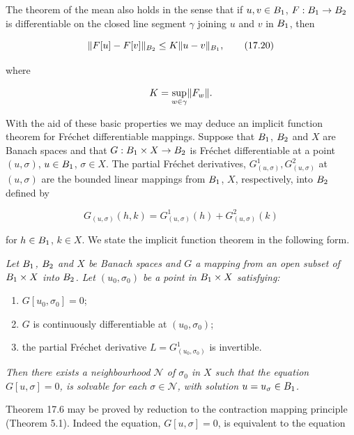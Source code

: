 The theorem of the mean also holds in the sense that if $u, v \in B_1$, $F : B_1 \to B_2$ is differentiable on the closed line segment $\gamma$ joining $u$ and $v$ in $B_1$, then

\begin{equation}
\lVert F[u] - F[v]\rVert_{B_2} \leq K \lVert u - v\rVert_{B_1},
\tag{17.20}
\end{equation}

where

\[
K = \sup_{w \in \gamma} \lVert F_w\rVert.
\]

With the aid of these basic properties we may deduce an implicit function theorem for Fr\'echet differentiable mappings. Suppose that $B_1$, $B_2$ and $X$ are Banach spaces and that $G : B_1 \times X \to B_2$ is Fr\'echet differentiable at a point $(u,\sigma)$, $u \in B_1$, $\sigma \in X$. The partial Fr\'echet derivatives, $G^{1}_{(u,\sigma)}, G^{2}_{(u,\sigma)}$ at $(u,\sigma)$ are the bounded linear mappings from $B_1$, $X$, respectively, into $B_2$ defined by

\[
G_{(u,\sigma)}(h,k) = G^{1}_{(u,\sigma)}(h) + G^{2}_{(u,\sigma)}(k)
\]

for $h \in B_1$, $k \in X$. We state the implicit function theorem in the following form.

\begin{theorem}[Theorem 17.6]\label{gt-ch17-thm-17-6}
\textit{Let $B_1$, $B_2$ and $X$ be Banach spaces and $G$ a mapping from an open subset of $B_1 \times X$ into $B_2$. Let $(u_0,\sigma_0)$ be a point in $B_1 \times X$ satisfying:}

\begin{enumerate}
\item[(i)] $G[u_0,\sigma_0] = 0$;
\item[(ii)] $G$ is continuously differentiable at $(u_0,\sigma_0)$;
\item[(iii)] the partial Fr\'echet derivative $L = G^{1}_{(u_0,\sigma_0)}$ is invertible.
\end{enumerate}

\textit{Then there exists a neighbourhood $\mathcal{N}$ of $\sigma_0$ in $X$ such that the equation $G[u,\sigma] = 0$, is solvable for each $\sigma \in \mathcal{N}$, with solution $u = u_\sigma \in B_1$.}
\end{theorem}




Theorem 17.6 may be proved by reduction to the contraction mapping principle
(Theorem 5.1). Indeed the equation, $G[u,\sigma]=0$, is equivalent to the equation

